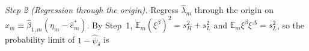 \emph{Step 2 (Regression through the origin).} Regress $\hat\lambda_m$ through the origin on $x_m\equiv\hat\beta_{1,m}(\eta_m-\hat e^*_m)$. By Step~1, $\mathbb E_m(\xi^\beta)^2=s_H^2+s_L^2$ and $\mathbb E_m\xi^\beta\xi^\Delta=s_L^2$, so the probability limit of $1-\hat\psi_\delta$ is
